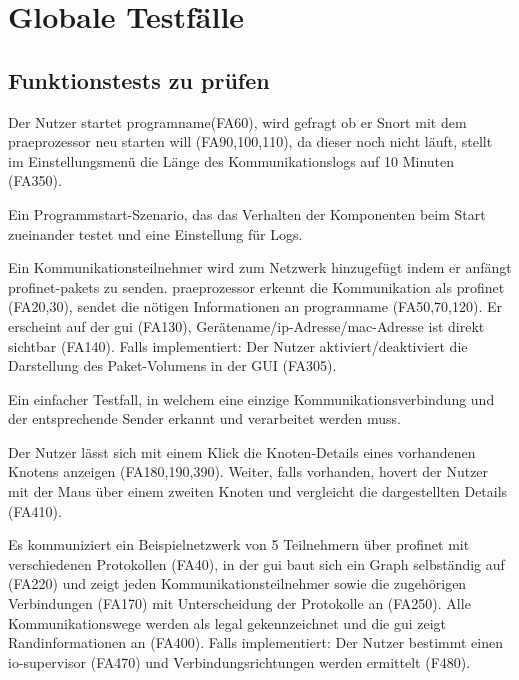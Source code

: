 \chapter{Globale Testfälle}

\section{Funktionstests zu prüfen}

\begin{description}[style=multiline, leftmargin=4cm, labelwidth=4cm]
  \item[\namedlabel{start}{Programm starten}] Der Nutzer startet \gls{programname}(FA60), wird gefragt ob er Snort mit dem \gls{praeprozessor} neu starten will (FA90,100,110), da dieser noch nicht läuft, stellt im Einstellungsmenü die Länge des Kommunikationslogs auf 10 Minuten (FA350).
  \item[Beschreibung] Ein Programmstart-Szenario, das das Verhalten der Komponenten beim Start zueinander testet und eine Einstellung für Logs.
  \item[\namedlabel{addNetNode}{Kommunikationsteilnehmer hinzufügen}] Ein Kommunikationsteilnehmer wird zum Netzwerk hinzugefügt indem er anfängt \gls{profinet}-\glspl{paket} zu senden. \gls{praeprozessor} erkennt die Kommunikation als \gls{profinet} (FA20,30), sendet die nötigen Informationen an \gls{programname} (FA50,70,120). Er erscheint auf der \gls{gui} (FA130), Gerätename/\gls{ip}-Adresse/\gls{mac}-Adresse ist direkt sichtbar (FA140). Falls implementiert: Der Nutzer aktiviert/deaktiviert die Darstellung des Paket-Volumens in der GUI (FA305).
  \item[Beschreibung] Ein einfacher Testfall, in welchem eine einzige Kommunikationsverbindung und der entsprechende Sender erkannt und verarbeitet werden muss.
  \item[\namedlabel{infobox}{Details anzeigen}] Der Nutzer lässt sich mit einem Klick die Knoten-Details eines vorhandenen Knotens anzeigen (FA180,190,390). Weiter, falls vorhanden, hovert der Nutzer mit der Maus über einem zweiten Knoten und vergleicht die dargestellten Details (FA410).
  \item[\namedlabel{normalWatch}{Normale Netzwerküberwachung}] Es kommuniziert ein Beispielnetzwerk von 5 Teilnehmern über \gls{profinet} mit verschiedenen Protokollen (FA40), in der \gls{gui} baut sich ein Graph selbständig auf (FA220) und zeigt jeden Kommunikationsteilnehmer sowie die zugehörigen Verbindungen (FA170) mit Unterscheidung der Protokolle an (FA250). Alle Kommunikationswege werden als legal gekennzeichnet und die \gls{gui} zeigt Randinformationen an (FA400). Falls implementiert: Der Nutzer bestimmt einen \gls{io-supervisor} (FA470) und Verbindungsrichtungen werden ermittelt (F480).

\end{description}
